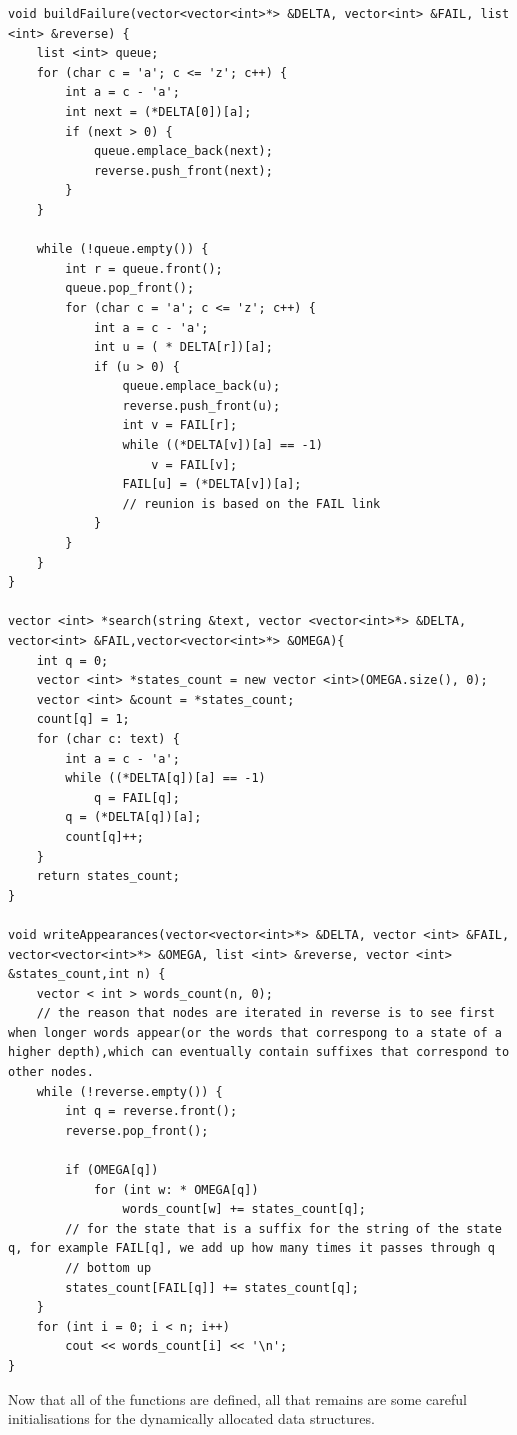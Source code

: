 \documentclass[letterpaper]{article}
\begin{document}
\begin{lstlisting}
void buildFailure(vector<vector<int>*> &DELTA, vector<int> &FAIL, list <int> &reverse) {
    list <int> queue;
    for (char c = 'a'; c <= 'z'; c++) {
        int a = c - 'a';
        int next = (*DELTA[0])[a];
        if (next > 0) {
            queue.emplace_back(next);
            reverse.push_front(next);
        }
    }

    while (!queue.empty()) {
        int r = queue.front();
        queue.pop_front();
        for (char c = 'a'; c <= 'z'; c++) {
            int a = c - 'a';
            int u = ( * DELTA[r])[a];
            if (u > 0) {
                queue.emplace_back(u);
                reverse.push_front(u);
                int v = FAIL[r];
                while ((*DELTA[v])[a] == -1)
                    v = FAIL[v];
                FAIL[u] = (*DELTA[v])[a];
                // reunion is based on the FAIL link
            }
        }
    }
}

vector <int> *search(string &text, vector <vector<int>*> &DELTA, vector<int> &FAIL,vector<vector<int>*> &OMEGA){
    int q = 0;
    vector <int> *states_count = new vector <int>(OMEGA.size(), 0);
    vector <int> &count = *states_count;
    count[q] = 1;
    for (char c: text) {
        int a = c - 'a';
        while ((*DELTA[q])[a] == -1)
            q = FAIL[q];
        q = (*DELTA[q])[a];
        count[q]++;
    }
    return states_count;
}

void writeAppearances(vector<vector<int>*> &DELTA, vector <int> &FAIL, vector<vector<int>*> &OMEGA, list <int> &reverse, vector <int> &states_count,int n) {
    vector < int > words_count(n, 0);
    // the reason that nodes are iterated in reverse is to see first when longer words appear(or the words that correspong to a state of a higher depth),which can eventually contain suffixes that correspond to other nodes.
    while (!reverse.empty()) {
        int q = reverse.front();
        reverse.pop_front();

        if (OMEGA[q])
            for (int w: * OMEGA[q])
                words_count[w] += states_count[q];
        // for the state that is a suffix for the string of the state q, for example FAIL[q], we add up how many times it passes through q
        // bottom up
        states_count[FAIL[q]] += states_count[q];
    }
    for (int i = 0; i < n; i++)
        cout << words_count[i] << '\n';
}
\end{lstlisting}

Now that all of the functions are defined, all that remains are some careful initialisations for the dynamically allocated data structures.
\end{document}
